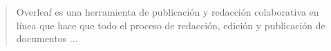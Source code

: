 {\color{blue}
{\bfseries\justify
\begin{quote}
Overleaf es una herramienta de publicación y redacción colaborativa en línea que hace que todo el proceso de redacción, edición y publicación de documentos ...\par
\end{quote}
}
}